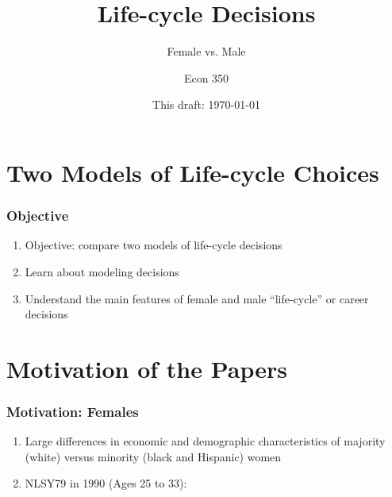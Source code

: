 

\title{Life-cycle Decisions}
\subtitle{Female vs. Male}
\author{Econ 350}
\date{This draft: \today}




\begin{frame}[plain]
	\titlepage
\end{frame}



\section{Two Models of Life-cycle Choices}

\begin{frame}
	\frametitle{Objective}
		\begin{enumerate}
 			\item Objective: compare two models of life-cycle decisions
 			\item Learn about modeling decisions
 			\item Understand the main features of female and male ``life-cycle'' or career decisions
 		\end{enumerate}
\end{frame}

\section{Motivation of the Papers}
\begin{frame}
	\frametitle{Motivation: Females}
	\begin{enumerate}
		\item Large differences in economic and demographic characteristics of majority (white) versus minority (black and Hispanic) women
		\item NLSY79 in 1990 (Ages 25 to 33):
	\end{enumerate}
\end{frame}

